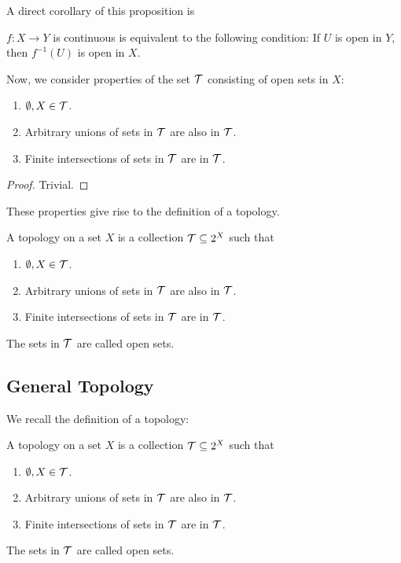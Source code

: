 A direct corollary of this proposition is 
\begin{corollary}
    $f\colon X \to Y$ is continuous is equivalent to the following condition: If $U$ is open in $Y$, then $f^{-1}(U)$ is open in $X$.
\end{corollary}

Now, we consider properties of the set $\mathcal T$ consisting of open sets in $X$:

\begin{theorem}
    \begin{enumerate}
        \item $\emptyset, X \in \mathcal T$.
        \item Arbitrary unions of sets in $\mathcal T$ are also in $\mathcal T$.
        \item Finite intersections of sets in $\mathcal T$ are in $\mathcal T$.
    \end{enumerate}
\end{theorem}
\begin{proof}
    Trivial.
\end{proof}

These properties give rise to the definition of a topology.

\begin{definition}[Topology]
    A topology on a set $X$ is a collection $\mathcal T \subseteq 2^X$ such that \begin{enumerate}
        \item $\emptyset, X \in \mathcal T$.
        \item Arbitrary unions of sets in $\mathcal T$ are also in $\mathcal T$.
        \item Finite intersections of sets in $\mathcal T$ are in $\mathcal T$.
    \end{enumerate}

    The sets in $\mathcal T$ are called open sets.
\end{definition}

\subsection{General Topology}

We recall the definition of a topology:

\begin{definition}[Topology]
    A topology on a set $X$ is a collection $\mathcal T \subseteq 2^X$ such that \begin{enumerate}
        \item $\emptyset, X \in \mathcal T$.
        \item Arbitrary unions of sets in $\mathcal T$ are also in $\mathcal T$.
        \item Finite intersections of sets in $\mathcal T$ are in $\mathcal T$.
    \end{enumerate}

    The sets in $\mathcal T$ are called open sets.
\end{definition}

